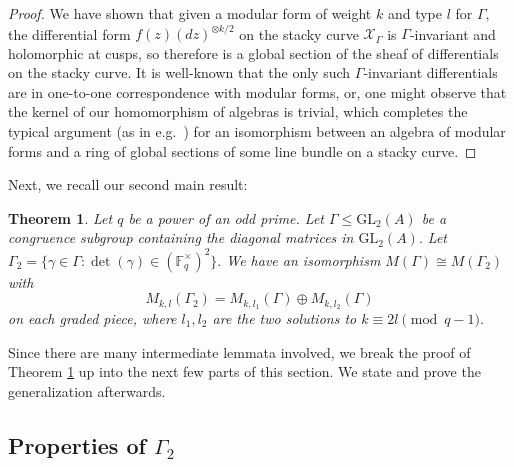 \documentclass[11pt]{amsart}
\newtheorem{theorem}{Theorem}[section]
\newtheorem{remark}[theorem]{Remark}
\theoremstyle{definition}
\numberwithin{equation}{section}
\newcommand{\GL}{\mathrm{GL}} 	%
\newcommand{\cO}{\mathcal{O}}		%
\newcommand{\sX}{\mathscr{X}}		%
\newcommand{\bbF}{\mathbb{F}}		%
\begin{document}
\begin{proof}
			We have shown that given a modular form of weight $k$ and type $l$ for $\Gamma,$ the differential form $f(z)(dz)^{\otimes k/2}$ on the stacky curve $\sX_{\Gamma}$ is $\Gamma$-invariant and holomorphic at cusps, so therefore is a global section of the sheaf of differentials on the stacky curve. It is well-known that the only such $\Gamma$-invariant differentials are in one-to-one correspondence with modular forms, or, one might observe that the kernel of our homomorphism of algebras is trivial, which completes the typical argument (as in e.g.\ \cite[Chapter $6.2$]{VZB}) for an isomorphism between an algebra of modular forms and a ring of global sections of some line bundle on a stacky curve.
		\end{proof}
		
		Next, we recall our second main result:
		\begin{theorem}
		\label{thm: decomp of mod forms}
			Let $q$ be a power of an odd prime. Let $\Gamma\leq \GL_2(A)$ be a congruence subgroup containing the diagonal matrices in $\GL_2(A).$ Let $\Gamma_2=\{\gamma\in \Gamma: \det(\gamma)\in (\bbF_q^{\times})^2\}.$ We have an isomorphism
			$M(\Gamma)\cong M(\Gamma_2)$
			with \[M_{k,l}(\Gamma_2)=M_{k,l_1}(\Gamma)\oplus M_{k,l_2}(\Gamma)\] on each graded piece, where $l_1,l_2$ are the two solutions to $k\equiv 2l\pmod{q-1}.$ 
		\end{theorem}
		
		Since there are many intermediate lemmata involved, we break the proof of Theorem \ref{thm: decomp of mod forms} up into the next few parts of this section. We state and prove the generalization afterwards.
		
		\subsection{Properties of $\Gamma_2$}
		
\end{document}
